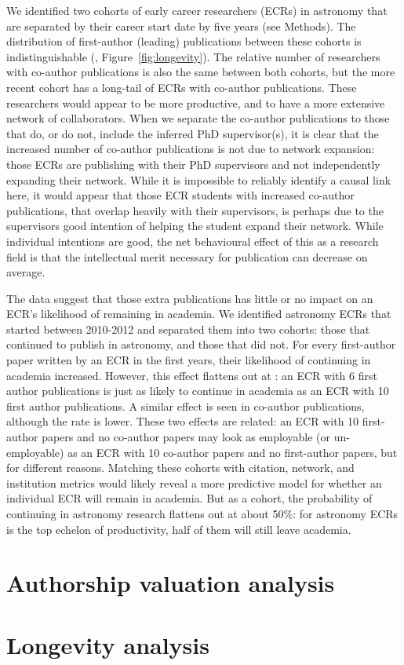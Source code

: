 We identified two cohorts of early career researchers (ECRs) in astronomy that are separated by their career start date by five years (see Methods). The distribution of first-author (leading) publications between these cohorts is indistinguishable (, Figure~\ref{fig:longevity}). The relative number of researchers with  co-author publications is also the same between both cohorts, but the more recent cohort has a long-tail of ECRs with  co-author publications. These researchers would appear to be more productive, and to have a more extensive network of collaborators. When we separate the co-author publications to those that do, or do not, include the inferred PhD supervisor(s), it is clear that the increased number of co-author publications is not due to network expansion: those ECRs are publishing with their PhD supervisors and not independently expanding their network. While it is impossible to reliably identify a causal link here, it would appear that those ECR students with increased co-author publications, that overlap heavily with their supervisors, is perhaps due to the supervisors good intention of helping the student expand their network. While individual intentions are good, the net behavioural effect of this as a research field is that the intellectual merit necessary for publication can decrease on average. 



The data suggest that those extra publications has little or no impact on an ECR's likelihood of remaining in academia. We identified astronomy ECRs that started between 2010-2012 and separated them into two cohorts: those that continued to publish in astronomy, and those that did not. For every first-author paper written by an ECR in the first  years, their likelihood of continuing in academia increased. However, this effect flattens out at : an ECR with 6 first author publications is just as likely to continue in academia as an ECR with 10 first author publications. A similar effect is seen in co-author publications, although the rate is lower. These two effects are related: an ECR with 10 first-author papers and no co-author papers may look as employable (or un-employable) as an ECR with 10 co-author papers and no first-author papers, but for different reasons. Matching these cohorts with citation, network, and institution metrics would likely reveal a more predictive model for whether an individual ECR will remain in academia. But as a cohort, the probability of continuing in astronomy research flattens out at about 50\%: for astronomy ECRs is the top echelon of productivity, half of them will still leave academia. 




\section*{Authorship valuation analysis}


\section*{Longevity analysis}


